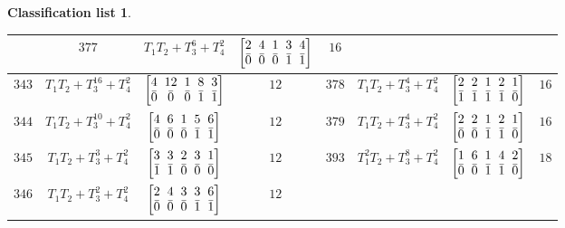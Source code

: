 \documentclass[10pt,a4paper]{amsart}
\theoremstyle{definition}
\newtheorem{class-list}[thm]{Classification list}
\numberwithin{equation}{section}
\begin{document}
\begin{class-list}
\begin{table}[h!]
\begin{tabu}{c|c|c|c||c|c|c|c}
&${377}$&${T_{1}T_{2}+T_{3}^{6}+T_{4}^{2}}$
&$\arraycolsep=1mm\begin{bmatrix}{2} & {4} & {1} & {3} & {4} \\ {\bar{0}} & {\bar{0}} & {\bar{0}} & {\bar{1}} & {\bar{1}}\end{bmatrix}$&${16}$
\\
\hline
${343}$&${T_{1}T_{2}+T_{3}^{16}+T_{4}^{2}}$
&$\arraycolsep=1mm\begin{bmatrix}{4} & {12} & {1} & {8} & {3} \\ {\bar{0}} & {\bar{0}} & {\bar{0}} & {\bar{1}} & {\bar{1}}\end{bmatrix}$&${12}$
&${378}$&${T_{1}T_{2}+T_{3}^{4}+T_{4}^{2}}$
&$\arraycolsep=1mm\begin{bmatrix}{2} & {2} & {1} & {2} & {1} \\ {\bar{1}} & {\bar{1}} & {\bar{1}} & {\bar{1}} & {\bar{0}}\end{bmatrix}$&${16}$
\\
\hline
${344}$&${T_{1}T_{2}+T_{3}^{10}+T_{4}^{2}}$
&$\arraycolsep=1mm\begin{bmatrix}{4} & {6} & {1} & {5} & {6} \\ {\bar{0}} & {\bar{0}} & {\bar{0}} & {\bar{1}} & {\bar{1}}\end{bmatrix}$&${12}$
&${379}$&${T_{1}T_{2}+T_{3}^{4}+T_{4}^{2}}$
&$\arraycolsep=1mm\begin{bmatrix}{2} & {2} & {1} & {2} & {1} \\ {\bar{0}} & {\bar{0}} & {\bar{1}} & {\bar{1}} & {\bar{0}}\end{bmatrix}$&${16}$
\\
\hline
${345}$&${T_{1}T_{2}+T_{3}^{3}+T_{4}^{2}}$
&$\arraycolsep=1mm\begin{bmatrix}{3} & {3} & {2} & {3} & {1} \\ {\bar{1}} & {\bar{1}} & {\bar{0}} & {\bar{0}} & {\bar{0}}\end{bmatrix}$&${12}$
&${393}$&${T_{1}^{2}T_{2}+T_{3}^{8}+T_{4}^{2}}$
&$\arraycolsep=1mm\begin{bmatrix}{1} & {6} & {1} & {4} & {2} \\ {\bar{0}} & {\bar{0}} & {\bar{1}} & {\bar{1}} & {\bar{0}}\end{bmatrix}$&${18}$
\\
\hline
${346}$&${T_{1}T_{2}+T_{3}^{2}+T_{4}^{2}}$
&$\arraycolsep=1mm\begin{bmatrix}{2} & {4} & {3} & {3} & {6} \\ {\bar{0}} & {\bar{0}} & {\bar{0}} & {\bar{1}} & {\bar{1}}\end{bmatrix}$&${12}$

\end{tabu}
\end{table}
\end{class-list}
\end{document}
